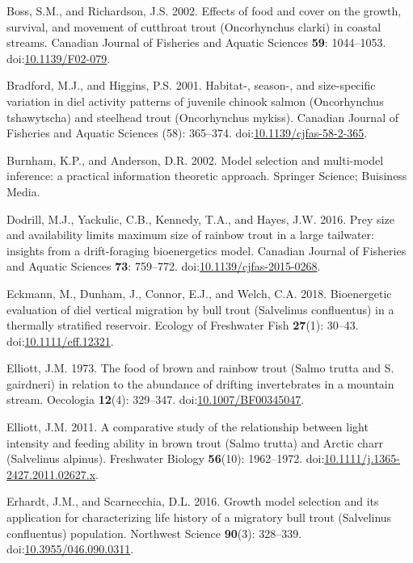 \documentclass[]{article}
\begin{document}
\hypertarget{ref-Boss2002}{}
Boss, S.M., and Richardson, J.S. 2002. Effects of food and cover on the
growth, survival, and movement of cutthroat trout (Oncorhynchus clarki)
in coastal streams. Canadian Journal of Fisheries and Aquatic Sciences
\textbf{59}: 1044--1053.
doi:\href{https://doi.org/10.1139/F02-079}{10.1139/F02-079}.

\hypertarget{ref-Bradford2001}{}
Bradford, M.J., and Higgins, P.S. 2001. Habitat-, season-, and
size-specific variation in diel activity patterns of juvenile chinook
salmon (Oncorhynchus tshawytscha) and steelhead trout (Oncorhynchus
mykiss). Canadian Journal of Fisheries and Aquatic Sciences (58):
365--374.
doi:\href{https://doi.org/10.1139/cjfas-58-2-365}{10.1139/cjfas-58-2-365}.

\hypertarget{ref-Burnham2002}{}
Burnham, K.P., and Anderson, D.R. 2002. Model selection and multi-model
inference: a practical information theoretic approach. Springer Science;
Buisiness Media.

\hypertarget{ref-Dodrill2016b}{}
Dodrill, M.J., Yackulic, C.B., Kennedy, T.A., and Hayes, J.W. 2016. Prey
size and availability limits maximum size of rainbow trout in a large
tailwater: insights from a drift-foraging bioenergetics model. Canadian
Journal of Fisheries and Aquatic Sciences \textbf{73}: 759--772.
doi:\href{https://doi.org/10.1139/cjfas-2015-0268}{10.1139/cjfas-2015-0268}.

\hypertarget{ref-Eckman2016}{}
Eckmann, M., Dunham, J., Connor, E.J., and Welch, C.A. 2018.
Bioenergetic evaluation of diel vertical migration by bull trout
(Salvelinus confluentus) in a thermally stratified reservoir. Ecology of
Freshwater Fish \textbf{27}(1): 30--43.
doi:\href{https://doi.org/10.1111/eff.12321}{10.1111/eff.12321}.

\hypertarget{ref-Elliott1973}{}
Elliott, J.M. 1973. The food of brown and rainbow trout (Salmo trutta
and S. gairdneri) in relation to the abundance of drifting invertebrates
in a mountain stream. Oecologia \textbf{12}(4): 329--347.
doi:\href{https://doi.org/10.1007/BF00345047}{10.1007/BF00345047}.

\hypertarget{ref-Elliott2011}{}
Elliott, J.M. 2011. A comparative study of the relationship between
light intensity and feeding ability in brown trout (Salmo trutta) and
Arctic charr (Salvelinus alpinus). Freshwater Biology \textbf{56}(10):
1962--1972.
doi:\href{https://doi.org/10.1111/j.1365-2427.2011.02627.x}{10.1111/j.1365-2427.2011.02627.x}.

\hypertarget{ref-Erhardt2016}{}
Erhardt, J.M., and Scarnecchia, D.L. 2016. Growth model selection and
its application for characterizing life history of a migratory bull
trout (Salvelinus confluentus) population. Northwest Science
\textbf{90}(3): 328--339.
doi:\href{https://doi.org/10.3955/046.090.0311}{10.3955/046.090.0311}.
\end{document}
